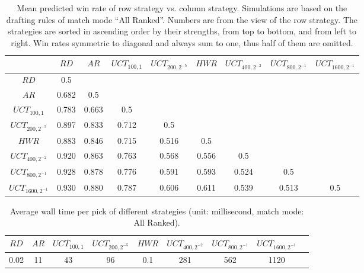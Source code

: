 \begin{table}
  \caption{Mean predicted win rate of row strategy  vs. column strategy. Simulations are based on the drafting rules of match mode ``All Ranked''. Numbers are from the view of the row strategy. The strategies are sorted in ascending order by their strengths, from top to bottom, and from left to right. Win rates symmetric to diagonal and always sum to one, thus half of them are omitted.}
  \label{tab:mcts}
  \centering
  \begin{tabular}{ccccccccc}
    \toprule
      & $RD$ & $AR$ & $UCT_{100, 1}$ & $UCT_{200, 2^{-5}}$ & $HWR$  & $UCT_{400, 2^{-2}}$ & $UCT_{800, 2^{-1}}$ & $UCT_{1600, 2^{-1}}$ \\
    \midrule
    $RD$ & 0.5 &  &  &  &  &  &  &  \\
    $AR$ & 0.682 & 0.5 &  &  &  &  &  & \\
    $UCT_{100, 1}$ & 0.783 & 0.663 & 0.5 & & &  &  \\
    $UCT_{200, 2^{-5}}$ & 0.897 & 0.833 & 0.712 & 0.5 & & & \\
    $HWR$ & 0.883 & 0.846 & 0.715 & 0.516 & 0.5 \\
    $UCT_{400, 2^{-2}}$ & 0.920 & 0.863 & 0.763 & 0.568 & 0.556 & 0.5   \\
    $UCT_{800, 2^{-1}}$ & 0.928 & 0.878  & 0.776 &  0.591 & 0.593 & 0.524 & 0.5 &  \\
$UCT_{1600, 2^{-1}}$ & 0.930 & 0.880  & 0.787 & 0.606 & 0.611 & 0.539 & 0.513 & 0.5 \\
  \bottomrule
\end{tabular}
\end{table}

\begin{table}
  \caption{Average wall time per pick of different strategies (unit: millisecond, match mode: All Ranked).}
  \label{tab:mcts_time}
  \centering
  \begin{tabular}{ccccccccc}
    \toprule
      $RD$ & $AR$ & $UCT_{100, 1}$ & $UCT_{200, 2^{-5}}$ & $HWR$  & $UCT_{400, 2^{-2}}$ & $UCT_{800, 2^{-1}}$ & $UCT_{1600, 2^{-1}}$ \\
    \midrule
     0.02 & 11 & 43 & 96 & 0.1 & 281 & 562 & 1120 \\
    \bottomrule
\end{tabular}
\end{table}

